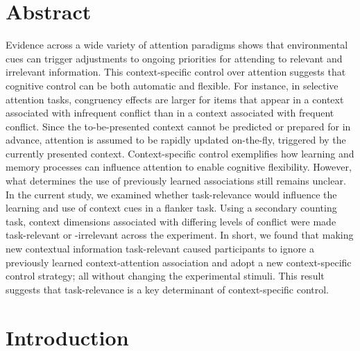 \documentclass[]{DissertateCUNY}
\begin{document}
\hypertarget{abstract-2}{%
\section{Abstract}\label{abstract-2}}

Evidence across a wide variety of attention paradigms shows that
environmental cues can trigger adjustments to ongoing priorities for
attending to relevant and irrelevant information. This context-specific
control over attention suggests that cognitive control can be both
automatic and flexible. For instance, in selective attention tasks,
congruency effects are larger for items that appear in a context
associated with infrequent conflict than in a context associated with
frequent conflict. Since the to-be-presented context cannot be predicted
or prepared for in advance, attention is assumed to be rapidly updated
on-the-fly, triggered by the currently presented context.
Context-specific control exemplifies how learning and memory processes
can influence attention to enable cognitive flexibility. However, what
determines the use of previously learned associations still remains
unclear. In the current study, we examined whether task-relevance would
influence the learning and use of context cues in a flanker task. Using
a secondary counting task, context dimensions associated with differing
levels of conflict were made task-relevant or -irrelevant across the
experiment. In short, we found that making new contextual information
task-relevant caused participants to ignore a previously learned
context-attention association and adopt a new context-specific control
strategy; all without changing the experimental stimuli. This result
suggests that task-relevance is a key determinant of context-specific
control.

\hypertarget{introduction-2}{%
\section{Introduction}\label{introduction-2}}
\end{document}

